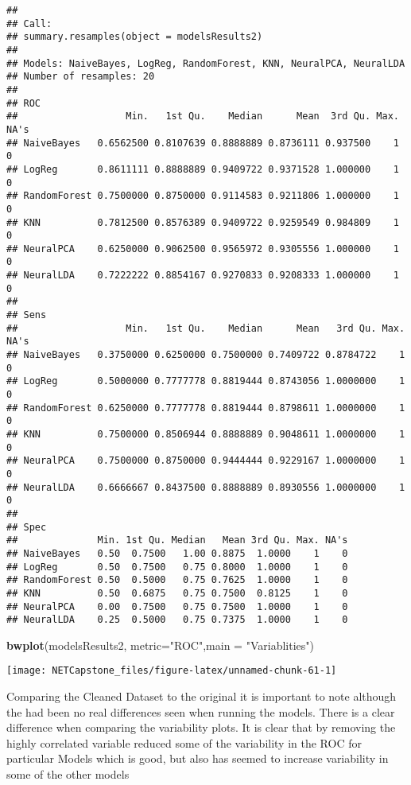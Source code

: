 \documentclass[
]{article}
\newenvironment{Shaded}{\begin{snugshade}}{\end{snugshade}}
\newcommand{\DataTypeTok}[1]{\textcolor[rgb]{0.13,0.29,0.53}{#1}}
\newcommand{\KeywordTok}[1]{\textcolor[rgb]{0.13,0.29,0.53}{\textbf{#1}}}
\newcommand{\NormalTok}[1]{#1}
\newcommand{\StringTok}[1]{\textcolor[rgb]{0.31,0.60,0.02}{#1}}
\begin{document}
\begin{verbatim}
## 
## Call:
## summary.resamples(object = modelsResults2)
## 
## Models: NaiveBayes, LogReg, RandomForest, KNN, NeuralPCA, NeuralLDA 
## Number of resamples: 20 
## 
## ROC 
##                   Min.   1st Qu.    Median      Mean  3rd Qu. Max. NA's
## NaiveBayes   0.6562500 0.8107639 0.8888889 0.8736111 0.937500    1    0
## LogReg       0.8611111 0.8888889 0.9409722 0.9371528 1.000000    1    0
## RandomForest 0.7500000 0.8750000 0.9114583 0.9211806 1.000000    1    0
## KNN          0.7812500 0.8576389 0.9409722 0.9259549 0.984809    1    0
## NeuralPCA    0.6250000 0.9062500 0.9565972 0.9305556 1.000000    1    0
## NeuralLDA    0.7222222 0.8854167 0.9270833 0.9208333 1.000000    1    0
## 
## Sens 
##                   Min.   1st Qu.    Median      Mean   3rd Qu. Max. NA's
## NaiveBayes   0.3750000 0.6250000 0.7500000 0.7409722 0.8784722    1    0
## LogReg       0.5000000 0.7777778 0.8819444 0.8743056 1.0000000    1    0
## RandomForest 0.6250000 0.7777778 0.8819444 0.8798611 1.0000000    1    0
## KNN          0.7500000 0.8506944 0.8888889 0.9048611 1.0000000    1    0
## NeuralPCA    0.7500000 0.8750000 0.9444444 0.9229167 1.0000000    1    0
## NeuralLDA    0.6666667 0.8437500 0.8888889 0.8930556 1.0000000    1    0
## 
## Spec 
##              Min. 1st Qu. Median   Mean 3rd Qu. Max. NA's
## NaiveBayes   0.50  0.7500   1.00 0.8875  1.0000    1    0
## LogReg       0.50  0.7500   0.75 0.8000  1.0000    1    0
## RandomForest 0.50  0.5000   0.75 0.7625  1.0000    1    0
## KNN          0.50  0.6875   0.75 0.7500  0.8125    1    0
## NeuralPCA    0.00  0.7500   0.75 0.7500  1.0000    1    0
## NeuralLDA    0.25  0.5000   0.75 0.7375  1.0000    1    0
\end{verbatim}

\begin{Shaded}
\begin{Highlighting}[]
\KeywordTok{bwplot}\NormalTok{(modelsResults2, }\DataTypeTok{metric=}\StringTok{"ROC"}\NormalTok{,}\DataTypeTok{main =} \StringTok{"Variablities"}\NormalTok{)}
\end{Highlighting}
\end{Shaded}

\begin{center}\texttt{[image: NETCapstone\_files/figure-latex/unnamed-chunk-61-1]} \end{center}

Comparing the Cleaned Dataset to the original it is important to note
although the had been no real differences seen when running the models.
There is a clear difference when comparing the variability plots. It is
clear that by removing the highly correlated variable reduced some of
the variability in the ROC for particular Models which is good, but also
has seemed to increase variability in some of the other models
\end{document}
